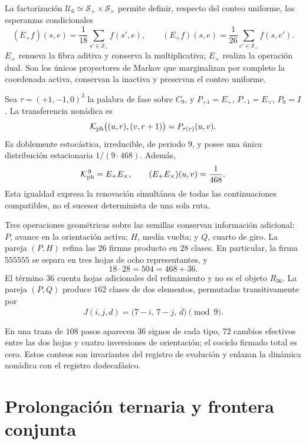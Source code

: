 La factorización \(\mathcal U_6\simeq\mathcal S_+\times\mathcal S_\times\)
permite definir, respecto del conteo uniforme, las esperanzas condicionales
\[
 (E_+f)(s,e)=\frac1{18}\sum_{s'\in\mathcal S_+}f(s',e),
 \qquad
 (E_\times f)(s,e)=\frac1{26}
 \sum_{e'\in\mathcal S_\times}f(s,e').
\]
\(E_+\) renueva la fibra aditiva y conserva la multiplicativa;
\(E_\times\) realiza la operación dual. Son los únicos proyectores de Markov
que marginalizan por completo la coordenada activa, conservan la inactiva y
preservan el conteo uniforme.

Sea \(\tau=(+1,-1,0)^3\) la palabra de fase sobre \(C_9\), y
\(P_{+1}=E_+\), \(P_{-1}=E_\times\), \(P_0=I\). La transferencia nonádica es
\[
 \mathcal K_{\rm ph}\bigl((u,r),(v,r+1)\bigr)
 =P_{\tau(r)}(u,v).
\]
Es doblemente estocástica, irreducible, de periodo \(9\), y posee una única
distribución estacionaria \(1/(9\cdot468)\). Además,
\[
 \mathcal K_{\rm ph}^{\,9}=E_+E_\times,\qquad
 (E_+E_\times)(u,v)=\frac1{468}.
\]
Esta igualdad expresa la renovación simultánea de todas las continuaciones
compatibles, no el sucesor determinista de una sola ruta.

Tres operaciones geométricas sobre las semillas conservan información
adicional: \(P\), avance en la orientación activa; \(H\), media vuelta; y
\(Q\), cuarto de giro. La pareja \((P,H)\) refina las \(26\) firmas producto
en \(28\) clases. En particular, la firma \(555555\) se separa en tres hojas
de ocho representantes, y
\[
 18\cdot28=504=468+36.
\]
El término \(36\) cuenta hojas adicionales del refinamiento y no es el
objeto \(R_{36}\). La pareja \((P,Q)\) produce \(162\) clases de dos
elementos, permutadas transitivamente por
\[
 J(i,j,d)=\bigl(7-i,\,7-j,\,\overline d\bigr)\pmod9.
\]

En una traza de \(108\) pasos aparecen \(36\) signos de cada tipo,
\(72\) cambios efectivos entre las dos hojas y cuatro inversiones de
orientación; el cociclo firmado total es cero. Estos conteos son invariantes
del registro de evoluci\'on y enlazan la dinámica nonádica con el registro dodecafásico.

\section{Prolongación ternaria y frontera conjunta}

